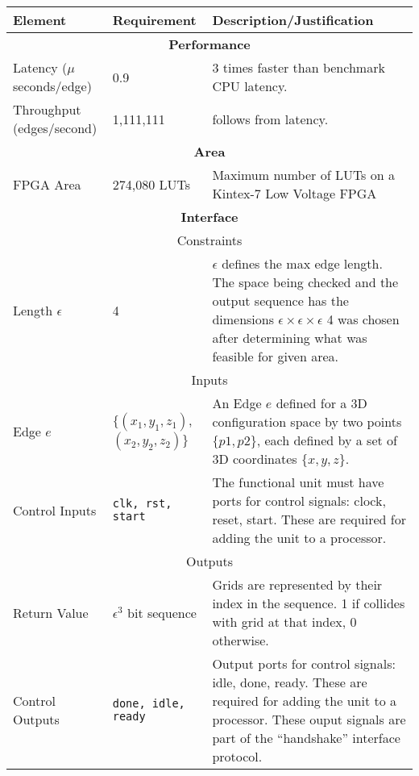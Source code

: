 \begin{table}[H]
\begin{center}
\begin{tabular}{|p{.19\linewidth}|p{.22 \linewidth}|p{.50\linewidth}|}
    \hline
    \textbf{Element}             & \textbf{Requirement} & \textbf{Description/Justification} \\
    \hline
    \multicolumn{3}{c}{\textbf{Performance}} \\
    \hline
    Latency ($\mu$seconds/edge)  &   0.9  & 3 times faster than benchmark CPU latency. \\
    \hline
    Throughput (edges/second)  &   1,111,111 & follows from latency. \\
    \hline
    \multicolumn{3}{c}{\textbf{Area}} \\
    \hline
    FPGA Area & 274,080 \glspl{LUT} & Maximum number of \glspl{LUT} on a Kintex-7 Low Voltage \gls{FPGA} \\
    \hline
    \multicolumn{3}{c}{\textbf{Interface}} \\
    \hline
    \multicolumn{3}{|c|}{Constraints} \\
    \hline
    Length $\epsilon$ & 4  & $\epsilon$ defines the max edge length. The space being checked and the output sequence has the dimensions $\epsilon\times\epsilon\times\epsilon$ 4 was chosen after determining what was feasible for given area. \\
    \hline
    \multicolumn{3}{|c|}{Inputs} \\
    \hline
    Edge $e$  & $\{(x_1,y_1,z_1)$, $(x_2,y_2,z_2)\}$& An Edge $e$ defined for a \gls{3D} \gls{configuration} space by two points $\{p1, p2\}$, each defined by a set of \gls{3D} coordinates $\{x,y,z\}$.\\
    \hline
    Control Inputs & \texttt{clk, rst, start} & The functional unit must have ports for control signals: clock, reset, start. These are required for adding the unit to a processor. \\
    \hline
    \multicolumn{3}{|c|}{Outputs} \\ 
    \hline
    Return Value & $\epsilon^3$ bit sequence & Grids are represented by their index in the sequence. 1 if collides with grid at that index, 0 otherwise.\\
    \hline
    Control Outputs & \texttt{done, idle, ready} &Output ports for control signals: idle, done, ready. These are required for adding the unit to a processor. These ouput signals are part of the ``handshake'' interface protocol. \\
    \hline
\end{tabular}
\end{center}
\end{table}